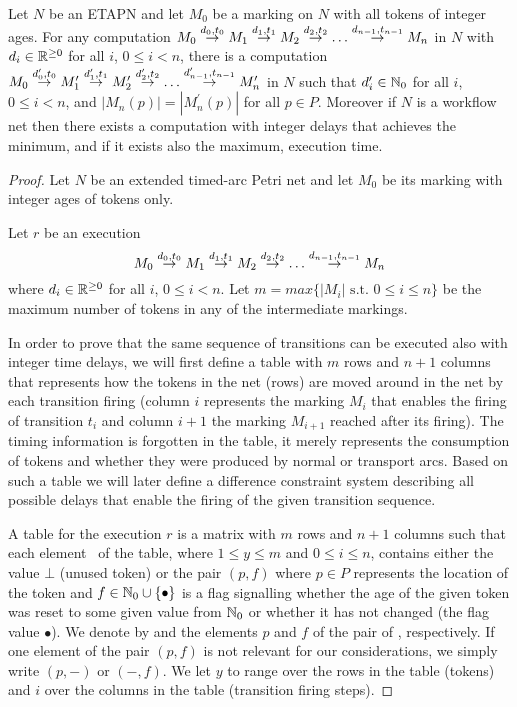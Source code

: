 \begin{theorem}\label{thm:discvscont}
Let $N$ be an ETAPN and let $M_0$ be a marking on $N$ with all tokens
of integer ages. For any computation 
$M_0 \stackrel{d_0,t_0}{\rightarrow} M_1 \stackrel{d_1,t_1}{\rightarrow} M_2 \stackrel{d_2,t_2}{\rightarrow} 
\ldots \stackrel{d_{n-1},t_{n-1}}{\rightarrow} M_{n}$ in $N$ 
with $d_i \in \mathbb{R}^{\geq 0}$ for all $i$, $0 \leq i < n$, there is a computation 
$M_0 \stackrel{d^\prime_0,t_0}{\rightarrow} M^\prime_1 \stackrel{d^\prime_1,t_1}{\rightarrow} M^\prime_2 \stackrel{d^\prime_2,t_2}{\rightarrow} 
\ldots \stackrel{d^\prime_{n-1},t_{n-1}}{\rightarrow} M^\prime_{n}$ in $N$ such that
$d^\prime_i \in \mathbb{N}_{0}$ for all $i$, $0 \leq i < n$, and
$|M_n(p)|=|M^\prime_n(p)|$ for all $p \in P$.
Moreover if $N$ is a workflow net then there exists a computation with 
integer delays that achieves
the minimum, and if it exists also the maximum, execution time. 
\end{theorem}
\begin{proof}
Let $N$ be an extended timed-arc Petri net and let $M_0$ be its marking
with integer ages of tokens only.

Let $r$ be an execution 
\begin{equation}\label{eq:execution}
M_0 \stackrel{d_0,t_0}{\rightarrow} M_1 \stackrel{d_1,t_1}{\rightarrow} M_2 \stackrel{d_2,t_2}{\rightarrow} 
\ldots \stackrel{d_{n-1},t_{n-1}}{\rightarrow} M_{n}
\end{equation}
where $d_i \in \mathbb{R}^{\geq 0}$ for all $i$, $0 \leq i <n$.
Let $m=max\{|M_i| \text{ s.t. } 0 \leq i \leq n\}$ be the maximum number of
tokens in any of the intermediate markings.

In order to prove that the same sequence of transitions can be executed
also with integer time delays, we will first define a table
with $m$ rows and $n+1$ columns that represents how the tokens
in the net (rows) are moved around in the net by each transition firing
(column $i$ represents the marking $M_i$ that enables the firing of
transition $t_i$ and column $i+1$ the marking $M_{i+1}$ reached after its firing). 
The timing information is forgotten in the table, it merely represents
the consumption of tokens and whether they were produced by normal or
transport arcs. Based on such a table we will later define a difference
constraint system describing all possible delays that enable the firing
of the given transition sequence.

A table  for the execution $r$ is a matrix with $m$ rows and
$n+1$ columns such that each element \tai \ of the table, where 
$1 \leq y \leq m$ and $0 \leq i \leq n$, contains either the value 
$\bot$ (unused token) or the pair $(p,f)$ where $p \in P$ represents the location of the token
and $f \in \mathbb{N}_{0} \cup \{\bullet\}$ is a flag signalling whether
the age of the given token was reset to some given value from $\mathbb{N}_{0}$
or whether it has not changed (the flag value $\bullet$).
We denote by \taip and \taif
the elements $p$ and $f$ of the pair of \tai, respectively.
If one element of the pair $(p,f)$ is not relevant for our considerations,
we simply write $(p,-)$ or $(-,f)$. We let $y$ to range over
the rows in the table (tokens) and $i$ over the columns in the table
(transition firing steps).


\end{proof}
